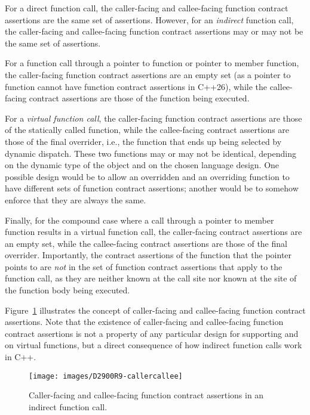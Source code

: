 For a direct function call, the caller-facing and callee-facing function contract assertions are the same set of assertions. However, for an \emph{indirect} function call, the caller-facing and callee-facing function contract assertions may or may not be the same set of assertions. 

For a function call through a pointer to function or pointer to member function, the caller-facing function contract assertions are an empty set (as a pointer to function cannot have function contract assertions in C++26), while the callee-facing contract assertions are those of the function being executed.

For a \emph{virtual function call}, the caller-facing function contract assertions are those of the statically called function, while the callee-facing contract assertions are those of the final overrider, i.e., the function that ends up being selected by dynamic dispatch. These two functions may or may not be identical, depending on the dynamic type of the object and on the chosen language design. One possible design would be to allow an overridden and an overriding function to have different sets of function contract assertions; another would be to somehow enforce that they are always the same.

Finally, for the compound case where a call through a pointer to member function results in a virtual function call, the caller-facing contract assertions are an empty set, while the callee-facing contract assertions are those of the final overrider. Importantly, the contract assertions of the function that the pointer points to are \emph{not} in the set of function contract assertions that apply to the function call, as they are neither known at the call site nor known at the site of the function body being executed.

Figure~\ref{fig_callercallee} illustrates the concept of caller-facing and callee-facing function contract assertions. Note that the existence of caller-facing and callee-facing function contract assertions is not a property of any particular design for supporting  and  on virtual functions, but a direct consequence of how indirect function calls work in C++.

\begin{figure}[b]
\begin{center}
\texttt{[image: images/D2900R9-callercallee]}
\end{center}
\caption{Caller-facing and callee-facing function contract assertions in an indirect function call.}
\label{fig_callercallee}
\end{figure}

